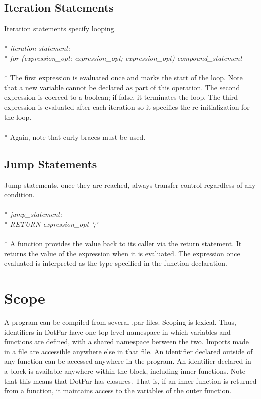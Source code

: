 \subsection{Iteration Statements}
Iteration statements specify looping.
\\ \\* \tab \emph{iteration-statement:}
\\* \tab \tab \emph{for (expression\_opt; expression\_opt; expression\_opt) compound\_statement}
\\ \\* The first expression is evaluated once and marks the start of the loop. Note that a new variable cannot be declared as part of this operation. The second expression is coerced to a boolean; if false, it terminates the loop. The third expression is evaluated after each iteration so it specifies the re-initialization for the loop.
\\ \\* Again, note that curly braces must be used.

\subsection{Jump Statements}
Jump statements, once they are reached, always transfer control regardless of any condition.
\\ \\* \tab \emph{jump\_statement:}
\\* \tab \tab \emph{RETURN expression\_opt `;'}
\\ \\* A function provides the value back to its caller via the return statement. It returns the value of the expression when it is evaluated. The expression once evaluated is interpreted as the type specified in the function declaration.

\section{Scope}
A program can be compiled from several .par files. Scoping is lexical. Thus, identifiers in DotPar have one top-level namespace in which variables and functions are defined, with a shared namespace between the two. Imports made in a file are accessible anywhere else in that file. An identifier declared outside of any function can be accessed anywhere in the program. An identifier declared in a block is available anywhere within the block, including inner functions. Note that this means that DotPar has closures. That is, if an inner function is returned from a function, it maintains access to the variables of the outer function.

